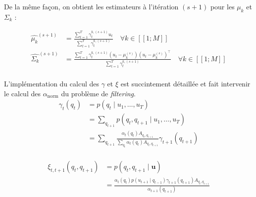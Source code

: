 \documentclass[12pt,a4paper,onecolumn]{article}
\begin{document}
De la même façon, on obtient les estimateurs à l'itération \((s+1)\) pour les \(\mu_k\) et \(\Sigma_k\) :

\begin{equation}
	\begin{aligned}
		\widehat{\mu_k}^{(s+1)}    & = \frac{\sum_{t = 1}^T \gamma_{t}^{k,(s+1)} u_t}{\sum_{t = 1}^T \gamma_{t}^{k,(s+1)}} \quad \forall k \in [\![1;M]\!]                                                                     \\
		\widehat{\Sigma_k}^{(s+1)} & = \frac{\sum_{t = 1}^T \gamma_{t}^{k,(s+1)}\left(u_t - \mu_k^{(s)}\right)\left(u_t - \mu_k^{(s)}\right)^{\intercal}}{\sum_{t = 1}^T \gamma_{t}^{k,(s+1)}} \quad \forall k \in [\![1;M]\!] \\
	\end{aligned}
\end{equation}

L'implémentation du calcul des \(\gamma\) et \(\xi\) est succintement détaillée et fait intervenir le calcul des \(\alpha_{\text{norm}}\) du problème de \textit{filtering}.
\begin{equation}
	\begin{split}
		\gamma_t(q_t) &= p(q_t \mid u_1, \dots, u_T)\\
		&= \sum_{q_{t+1}}p(q_t, q_{t+1} \mid u_1, \dots, u_T)\\
		&= \sum_{q_{t+1}} \frac{\alpha_t(q_t)A_{q_t, q_{t+1}}}{\sum_{q_t}\alpha_t(q_t)A_{q_t, q_{t+1}}}\gamma_{t+1}(q_{t+1})\\
	\end{split}
\end{equation}

\begin{equation}
	\begin{split}
		\xi_{t,t+1}(q_t, q_{t+1}) &= p(q_t, q_{t+1} \mid \bm{u})\\
		&= \frac{\alpha_t(q_t)p(u_{t+1} \mid q_{t-1})\gamma_{t+1}(q_{t+1})A_{q_t, q_{t+1}}}{\alpha_{t+1}(q_{t+1})}\\
	\end{split}
\end{equation}
\end{document}
